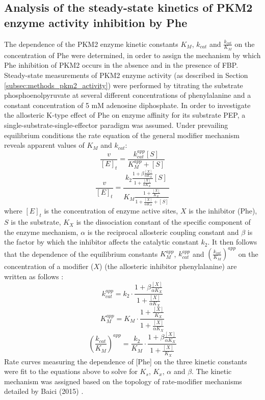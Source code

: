 \subsection{Analysis of the steady-state kinetics of PKM2 enzyme activity inhibition by Phe}
\label{subsec:methods_pkm2_phe_fbp_activity}
The dependence of the PKM2 enzyme kinetic constants $K_{M}$, $k_{cat}$ and $\frac{k_{cat}}{K_{M}}$ on the concentration of Phe were determined, in order to assign the mechanism by which Phe inhibition of PKM2 occurs in the absence and in the presence of FBP. Steady-state measurements of PKM2 enzyme activity (as described in Section \ref{subsec:methods_pkm2_activity}) were performed by titrating the substrate phosphoenolpyruvate at several different concentrations of phenylalanine and a constant concentration of 5 mM adenosine diphosphate. In order to investigate the allosteric K-type effect of Phe on enzyme affinity for its substrate PEP, a single-substrate-single-effector paradigm was assumed. Under prevailing equilibrium conditions the rate equation of the general modifier mechanism reveals apparent values of $K_{M}$ and $k_{cat}$:
%
%
\begin{equation}
\frac{v}{[E]_t} = \frac{k_{cat}^{app} [S]}{K_{M}^{app} + [S]}
\end{equation}
%
%
\begin{equation}
\frac{v}{[E]_t} = \frac{k_2 \frac{1 + \beta \frac{[X]}{\alpha K_X}}{1 + \frac{[X]}{\alpha K_X}} [S] }{ K_M \frac{ 1 + \frac{[X]}{K_X} }{ 1 + \frac{[X]}{\alpha K_X} + [S] } }
\label{equ:kcat_km_rate}
\end{equation}
%
%
where $[E]_t$ is the concentration of enzyme active sites, $X$ is the inhibitor (Phe), $S$ is the substrate, $K_X$ is the dissociation constant of the specific component of the enzyme mechanism, $\alpha$ is the reciprocal allosteric coupling constant and $\beta$ is the factor by which the inhibitor affects the catalytic constant $k_2$. It then follows that the dependence of the equilibrium constants $K_{M}^{app}$, $k_{cat}^{app}$ and $(\frac{k_{cat}}{K_{M}})^{app}$ on the concentration of a modifier ($X$) (the allosteric inhibitor phenylalanine) are written as follows \cite{Baici:2015}:
%
%
\begin{equation}
k_{cat}^{app} = k_2 \cdot \frac{1 + \beta \frac{[X]}{\alpha K_{X}}}{1 + \frac{[X]}{\alpha K_{X}}}
\label{equ:effector_kcat}
\end{equation}
%
%
\begin{equation}
K_{M}^{app} = K_{M} \cdot \frac{1 + \frac{[X]}{K_{X}}}{1 + \frac{[X]}{\alpha K_{X}}}
\label{equ:effector_KM}
\end{equation}
%
%
\begin{equation}
\left(  \frac{k_{cat}}{K_{M}} \right)  ^{app} = \frac{k_2}{K_{M}} \cdot \frac{1 + \beta \frac{[X]}{\alpha K_{X}}}{1 + \frac{[X]}{K_{X}}}
\label{equ:effector_kcatkm}
\end{equation}
%
%
Rate curves measuring the dependence of [Phe] on the three kinetic constants were fit to the equations above to solve for $K_{s}$, $K_{x}$, $\alpha$ and $\beta$. The kinetic mechanism was assigned based on the topology of rate-modifier mechanisms detailed by Baici (2015) \cite{Baici:2015}.

